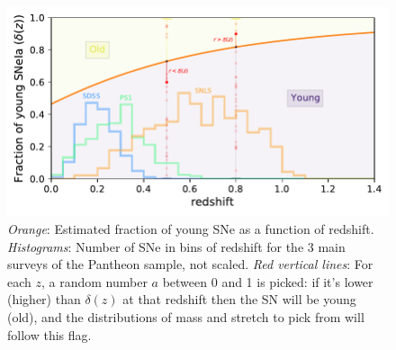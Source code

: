 \documentclass[]{aa}
\begin{document}
\begin{figure}[]
    \centering
    \includegraphics[width=\linewidth]{deltaz_hist_yo-random.pdf}
    \caption{\textit{Orange}: Estimated fraction of young SNe as a function of
        redshift. \textit{Histograms}: Number of SNe in bins of redshift for the
        3 main surveys of the Pantheon sample, not scaled. \textit{Red vertical
        lines}: For each $z$, a random number $a$ between 0 and 1 is picked: if
    it's lower (higher) than $\delta(z)$ at that redshift then the SN will be
young (old), and the distributions of mass and stretch to pick from will follow
this flag.}
    \label{fig:deltaz}
\end{figure}





\end{document}
